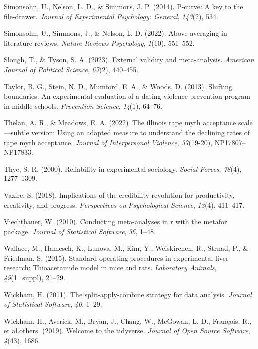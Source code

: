 \documentclass[
  ,jou]{apa6}
\newlength{\cslhangindent}
\newenvironment{CSLReferences}[2] %
 {\begin{list}{}{%
  \setlength{\itemindent}{0pt}
  \setlength{\leftmargin}{0pt}
  \setlength{\parsep}{0pt}
  \ifodd #1
   \setlength{\leftmargin}{\cslhangindent}
   \setlength{\itemindent}{-1\cslhangindent}
  \fi
  \setlength{\itemsep}{#2\baselineskip}}}
 {\end{list}}
\begin{document}
\begin{CSLReferences}{1}{0}
Simonsohn, U., Nelson, L. D., \& Simmons, J. P. (2014). P-curve: A key to the file-drawer. \emph{Journal of Experimental Psychology: General}, \emph{143}(2), 534.

Simonsohn, U., Simmons, J., \& Nelson, L. D. (2022). Above averaging in literature reviews. \emph{Nature Reviews Psychology}, \emph{1}(10), 551--552.

Slough, T., \& Tyson, S. A. (2023). External validity and meta-analysis. \emph{American Journal of Political Science}, \emph{67}(2), 440--455.

Taylor, B. G., Stein, N. D., Mumford, E. A., \& Woods, D. (2013). Shifting boundaries: An experimental evaluation of a dating violence prevention program in middle schools. \emph{Prevention Science}, \emph{14}(1), 64--76.

Thelan, A. R., \& Meadows, E. A. (2022). The illinois rape myth acceptance scale---subtle version: Using an adapted measure to understand the declining rates of rape myth acceptance. \emph{Journal of Interpersonal Violence}, \emph{37}(19-20), NP17807--NP17833.

Thye, S. R. (2000). Reliability in experimental sociology. \emph{Social Forces}, \emph{78}(4), 1277--1309.

Vazire, S. (2018). Implications of the credibility revolution for productivity, creativity, and progress. \emph{Perspectives on Psychological Science}, \emph{13}(4), 411--417.

Viechtbauer, W. (2010). Conducting meta-analyses in r with the metafor package. \emph{Journal of Statistical Software}, \emph{36}, 1--48.

Wallace, M., Hamesch, K., Lunova, M., Kim, Y., Weiskirchen, R., Strnad, P., \& Friedman, S. (2015). Standard operating procedures in experimental liver research: Thioacetamide model in mice and rats. \emph{Laboratory Animals}, \emph{49}(1\_suppl), 21--29.

Wickham, H. (2011). The split-apply-combine strategy for data analysis. \emph{Journal of Statistical Software}, \emph{40}, 1--29.

Wickham, H., Averick, M., Bryan, J., Chang, W., McGowan, L. D., François, R., et al.others. (2019). Welcome to the tidyverse. \emph{Journal of Open Source Software}, \emph{4}(43), 1686.

\end{CSLReferences}
\end{document}
